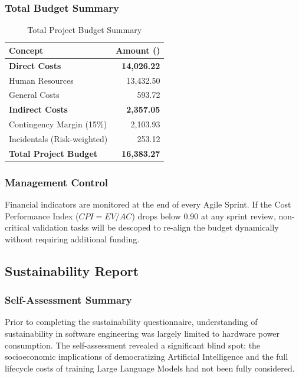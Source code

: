 \documentclass[11pt, a4paper]{article}
\begin{document}
\subsubsection*{Total Budget Summary}
\begin{table}[H]
\centering
\caption{Total Project Budget Summary}
\label{tab:total_budget}
\begin{tabular}{@{}lr@{}}
\toprule
\textbf{Concept} & \textbf{Amount (\texteuro{})} \\ \midrule
\textbf{Direct Costs} & \textbf{14,026.22} \\
\hspace{0.5cm} Human Resources & 13,432.50 \\
\hspace{0.5cm} General Costs & 593.72 \\ \midrule
\textbf{Indirect Costs} & \textbf{2,357.05} \\
\hspace{0.5cm} Contingency Margin (15\%) & 2,103.93 \\
\hspace{0.5cm} Incidentals (Risk-weighted) & 253.12 \\ \midrule
\textbf{Total Project Budget} & \textbf{16,383.27} \\ \bottomrule
\end{tabular}
\end{table}

\subsubsection*{Management Control}
Financial indicators are monitored at the end of every Agile Sprint. If the Cost Performance Index ($CPI = EV/AC$) drops below 0.90 at any sprint review, non-critical validation tasks will be descoped to re-align the budget dynamically without requiring additional funding.

\subsection*{Sustainability Report}
\label{subsec:sustainability}

\subsubsection*{Self-Assessment Summary}
Prior to completing the sustainability questionnaire, understanding of sustainability in software engineering was largely limited to hardware power consumption. The self-assessment revealed a significant blind spot: the socioeconomic implications of democratizing Artificial Intelligence and the full lifecycle costs of training Large Language Models had not been fully considered.
\end{document}
